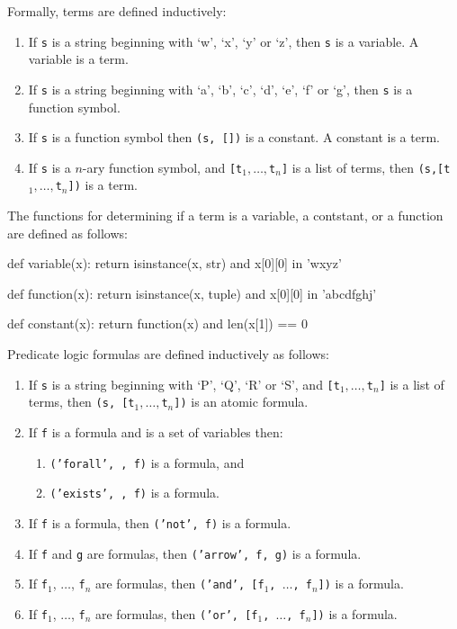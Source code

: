 \documentclass[a4paper,notitlepage]{scrartcl}
\begin{document}
Formally, terms are defined inductively:
\begin{enumerate}
\item If \texttt{s} is a string beginning with `w', `x', `y' or `z', then
   \texttt{s} is a variable.
A variable is a term.
\item If \texttt{s} is a string beginning with `a', `b', `c', `d', `e', `f' or
   `g', then \texttt{s} is a function symbol.
\item If \texttt{s} is a function symbol then \texttt{(s, [])} is a constant.
A constant is a term.
\item  
If \texttt{s} is a $n$-ary function symbol, and \texttt{[t$_1,\ldots,$t$_n$]} 
   is a list of terms, then \texttt{(s,[t$_1,\ldots,$t$_n$])} is a term.
\end{enumerate}

The functions for determining if a term is a variable, a contstant, or a
   function are defined as follows:
\begin{code}
def variable(x):
    return isinstance(x, str) and x[0][0] in 'wxyz'

def function(x):
    return isinstance(x, tuple) and x[0][0] in 'abcdfghj'

def constant(x):
    return function(x) and len(x[1]) == 0 
\end{code}

Predicate logic formulas are defined inductively as follows:
\begin{enumerate}
\item If \texttt{s} is a string beginning with `P', `Q', `R' or `S', and 
   \texttt{[t$_1,\ldots,$t$_n$]} is a list of terms, then \texttt{(s, [t$_1,
      \ldots, $t$_n$])} is an atomic formula.
\item If \texttt{f} is a formula and \texttt{} is a set of
   variables then:
   \begin{enumerate}
      \item \texttt{('forall', , f)} is a formula, and
      \item \texttt{('exists', , f)} is a formula.
   \end{enumerate}

\item
If \texttt{f} is a formula, then \texttt{('not', f)} is a formula.

\item
If \texttt{f} and \texttt{g} are formulas, then \texttt{('arrow', f, g)} is a
formula.

\item
If \texttt{f}$_1$, $\ldots$, \texttt{f}$_n$ are formulas, then \texttt{('and',
[f$_1$, $\ldots$, f$_n$])} is a formula.

\item
If \texttt{f}$_1$, $\ldots$, \texttt{f}$_n$ are formulas, then \texttt{('or',
[f$_1$, $\ldots$, f$_n$])} is a formula.
\end{enumerate}
\end{document}
